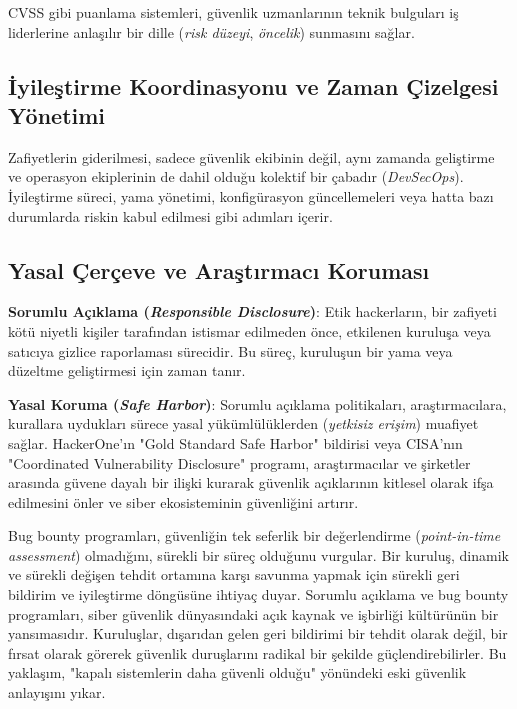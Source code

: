 CVSS gibi puanlama sistemleri, güvenlik uzmanlarının teknik bulguları iş liderlerine anlaşılır bir dille (\textit{risk düzeyi}, \textit{öncelik}) sunmasını sağlar.

\subsection{İyileştirme Koordinasyonu ve Zaman Çizelgesi Yönetimi}

Zafiyetlerin giderilmesi, sadece güvenlik ekibinin değil, aynı zamanda geliştirme ve operasyon ekiplerinin de dahil olduğu kolektif bir çabadır (\textit{DevSecOps}). İyileştirme süreci, yama yönetimi, konfigürasyon güncellemeleri veya hatta bazı durumlarda riskin kabul edilmesi gibi adımları içerir.

\subsection{Yasal Çerçeve ve Araştırmacı Koruması}

\textbf{Sorumlu Açıklama (\textit{Responsible Disclosure})}: Etik hackerların, bir zafiyeti kötü niyetli kişiler tarafından istismar edilmeden önce, etkilenen kuruluşa veya satıcıya gizlice raporlaması sürecidir. Bu süreç, kuruluşun bir yama veya düzeltme geliştirmesi için zaman tanır.

\textbf{Yasal Koruma (\textit{Safe Harbor})}: Sorumlu açıklama politikaları, araştırmacılara, kurallara uydukları sürece yasal yükümlülüklerden (\textit{yetkisiz erişim}) muafiyet sağlar. HackerOne'ın "Gold Standard Safe Harbor" bildirisi veya CISA'nın "Coordinated Vulnerability Disclosure" programı, araştırmacılar ve şirketler arasında güvene dayalı bir ilişki kurarak güvenlik açıklarının kitlesel olarak ifşa edilmesini önler ve siber ekosisteminin güvenliğini artırır.

Bug bounty programları, güvenliğin tek seferlik bir değerlendirme (\textit{point-in-time assessment}) olmadığını, sürekli bir süreç olduğunu vurgular. Bir kuruluş, dinamik ve sürekli değişen tehdit ortamına karşı savunma yapmak için sürekli geri bildirim ve iyileştirme döngüsüne ihtiyaç duyar. Sorumlu açıklama ve bug bounty programları, siber güvenlik dünyasındaki açık kaynak ve işbirliği kültürünün bir yansımasıdır. Kuruluşlar, dışarıdan gelen geri bildirimi bir tehdit olarak değil, bir fırsat olarak görerek güvenlik duruşlarını radikal bir şekilde güçlendirebilirler. Bu yaklaşım, "kapalı sistemlerin daha güvenli olduğu" yönündeki eski güvenlik anlayışını yıkar.
